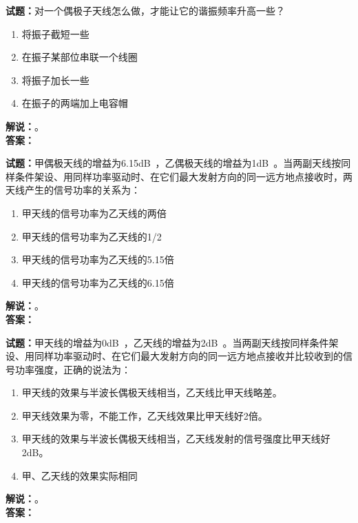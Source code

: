 \documentclass{ctexbook}
\begin{document}
\vspace{\baselineskip}

\noindent\textbf{试题：}对一个偶极子天线怎么做，才能让它的谐振频率升高一些？
\begin{enumerate}[leftmargin=3em]
  \item 将振子截短一些
  \item 在振子某部位串联一个线圈
  \item 将振子加长一些
  \item 在振子的两端加上电容帽
\end{enumerate}
\noindent\textbf{解说：}\textbf{}。\\\noindent\textbf{答案：}

\vspace{\baselineskip}

\noindent\textbf{试题：}甲偶极天线的增益为6.15\unit[qualifier-mode=combine]{\deci\bel{}}，乙偶极天线的增益为1\unit[qualifier-mode=combine]{\deci\bel{}}。当两副天线按同样条件架设、用同样功率驱动时、在它们最大发射方向的同一远方地点接收时，两天线产生的信号功率的关系为：
\begin{enumerate}[leftmargin=3em]
  \item 甲天线的信号功率为乙天线的两倍
  \item 甲天线的信号功率为乙天线的1/2
  \item 甲天线的信号功率为乙天线的5.15倍
  \item 甲天线的信号功率为乙天线的6.15倍
\end{enumerate}
\noindent\textbf{解说：}\textbf{}。\\\noindent\textbf{答案：}

\vspace{\baselineskip}

\noindent\textbf{试题：}甲天线的增益为0\unit[qualifier-mode=combine]{\deci\bel{}}，乙天线的增益为2\unit[qualifier-mode=combine]{\deci\bel{}}。当两副天线按同样条件架设、用同样功率驱动时、在它们最大发射方向的同一远方地点接收并比较收到的信号功率强度，正确的说法为：
\begin{enumerate}[leftmargin=3em]
  \item 甲天线的效果与半波长偶极天线相当，乙天线比甲天线略差。
  \item 甲天线效果为零，不能工作，乙天线效果比甲天线好2倍。
  \item 甲天线的效果与半波长偶极天线相当，乙天线发射的信号强度比甲天线好2dB。
  \item 甲、乙天线的效果实际相同
\end{enumerate}
\noindent\textbf{解说：}\textbf{}。\\\noindent\textbf{答案：}
\end{document}
